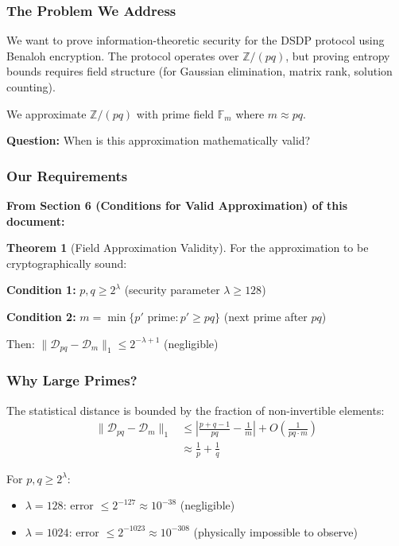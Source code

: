 \documentclass[11pt]{article}
\theoremstyle{definition}
\newtheorem{theorem}{Theorem}
\begin{document}
\subsubsection{The Problem We Address}

We want to prove information-theoretic security for the DSDP protocol using Benaloh encryption. The protocol operates over $\mathbb{Z}/(pq)$, but proving entropy bounds requires field structure (for Gaussian elimination, matrix rank, solution counting).

We approximate $\mathbb{Z}/(pq)$ with prime field $\mathbb{F}_m$ where $m \approx pq$.

\textbf{Question:} When is this approximation mathematically valid?

\subsubsection{Our Requirements}

\textbf{From Section 6 (Conditions for Valid Approximation) of this document:}

\begin{theorem}[Field Approximation Validity]
For the approximation to be cryptographically sound:

\textbf{Condition 1:} $p, q \geq 2^\lambda$ (security parameter $\lambda \geq 128$)

\textbf{Condition 2:} $m = \min\{p' \text{ prime} : p' \geq pq\}$ (next prime after $pq$)

Then: $\|\mathcal{D}_{pq} - \mathcal{D}_m\|_1 \leq 2^{-\lambda+1}$ (negligible)
\end{theorem}

\subsubsection{Why Large Primes?}

The statistical distance is bounded by the fraction of non-invertible elements:
\begin{align*}
\|\mathcal{D}_{pq} - \mathcal{D}_m\|_1 &\leq \left|\frac{p+q-1}{pq} - \frac{1}{m}\right| + O\left(\frac{1}{pq \cdot m}\right) \\
&\approx \frac{1}{p} + \frac{1}{q}
\end{align*}

For $p, q \geq 2^\lambda$:
\begin{itemize}
\item $\lambda = 128$: error $\leq 2^{-127} \approx 10^{-38}$ (negligible)
\item $\lambda = 1024$: error $\leq 2^{-1023} \approx 10^{-308}$ (physically impossible to observe)
\end{itemize}
\end{document}
